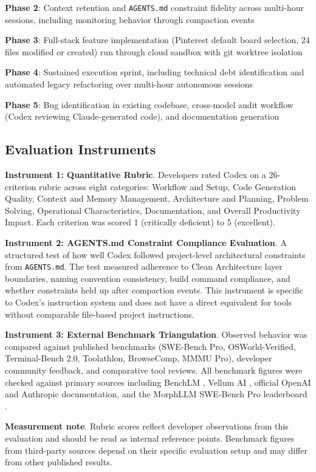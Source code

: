 \documentclass[conference]{IEEEtran}
\begin{document}
\textbf{Phase 2}: Context retention and \texttt{AGENTS.md} constraint fidelity across multi-hour sessions, including monitoring behavior through compaction events

\textbf{Phase 3}: Full-stack feature implementation (Pinterest default board selection, 24 files modified or created) run through cloud sandbox with git worktree isolation

\textbf{Phase 4}: Sustained execution sprint, including technical debt identification and automated legacy refactoring over multi-hour autonomous sessions

\textbf{Phase 5}: Bug identification in existing codebase, cross-model audit workflow (Codex reviewing Claude-generated code), and documentation generation

\subsection{Evaluation Instruments}

\textbf{Instrument 1: Quantitative Rubric}. Developers rated Codex on a 26-criterion rubric across eight categories: Workflow and Setup, Code Generation Quality, Context and Memory Management, Architecture and Planning, Problem Solving, Operational Characteristics, Documentation, and Overall Productivity Impact. Each criterion was scored 1 (critically deficient) to 5 (excellent).

\textbf{Instrument 2: AGENTS.md Constraint Compliance Evaluation}. A structured test of how well Codex followed project-level architectural constraints from \texttt{AGENTS.md}. The test measured adherence to Clean Architecture layer boundaries, naming convention consistency, build command compliance, and whether constraints held up after compaction events. This instrument is specific to Codex's instruction system and does not have a direct equivalent for tools without comparable file-based project instructions.

\textbf{Instrument 3: External Benchmark Triangulation}. Observed behavior was compared against published benchmarks (SWE-Bench Pro, OSWorld-Verified, Terminal-Bench 2.0, Toolathlon, BrowseComp, MMMU Pro), developer community feedback, and comparative tool reviews. All benchmark figures were checked against primary sources including BenchLM \cite{benchlm2026}, Vellum AI \cite{vellum2026}, official OpenAI and Anthropic documentation, and the MorphLLM SWE-Bench Pro leaderboard \cite{morphllm2026}.

\textbf{Measurement note}. Rubric scores reflect developer observations from this evaluation and should be read as internal reference points. Benchmark figures from third-party sources depend on their specific evaluation setup and may differ from other published results.
\end{document}
